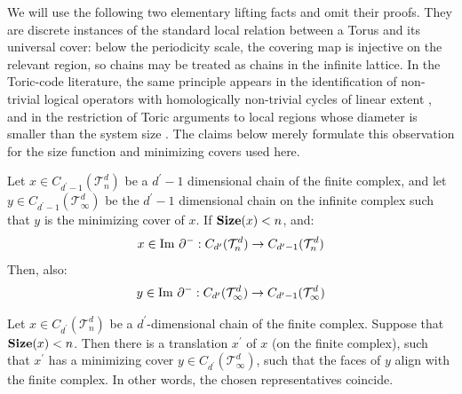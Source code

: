 We will use the following two elementary lifting facts and omit their proofs. They are discrete instances of the standard local relation between a Torus and its universal cover: below the periodicity scale, the covering map is injective on the relevant region, so chains may be treated as chains in the infinite lattice. In the Toric-code literature, the same principle appears in the identification of non-trivial logical operators with homologically non-trivial cycles of linear extent \cite{Dennis_2002}, and in the restriction of Toric arguments to local regions whose diameter is smaller than the system size \cite{Kubica_2019}. The claims below merely formulate this observation for the size function and minimizing covers used here.

\begin{claim}
  \label{claim:liftb}
  Let $x \in C_{d^{\prime}-1}(\mathcal{T}_n^d)$ be a $d^{\prime}-1$ dimensional chain of the finite complex, and let $y \in C_{d^{\prime}-1}(\mathcal T_\infty^d)$ be the $d^{\prime}-1$ dimensional chain on the infinite complex such that $y$ is the minimizing cover of $x$. If $\mathbf{Size}(x) < n$, and:
\begin{equation*}
  \begin{split}
    x \in \text{Im } \partial^{-} : C_{d^{\prime}}(\mathcal{T}_n^d) \rightarrow C_{d^{\prime}-1}(\mathcal{T}_n^d)
  \end{split}
\end{equation*}
Then, also:
\begin{equation*}
  \begin{split}
    y \in \text{Im } \partial^{-} : C_{d^{\prime}}(\mathcal T_\infty^d) \rightarrow C_{d^{\prime}-1}(\mathcal T_\infty^d)
  \end{split}
\end{equation*}
\end{claim}

\begin{claim}
  \label{claim:liftc}
Let $x \in C_{d^{\prime}}(\mathcal{T}_n^d)$ be a $d^{\prime}$-dimensional chain of the finite complex. Suppose that $\mathbf{Size}(x) < n$. Then there is a translation $x^{\prime}$ of $x$ (on the finite complex), such that $x^{\prime}$ has a minimizing cover $y \in C_{d^{\prime}}(\mathcal T_\infty^d)$, such that the faces of $y$ align with the finite complex. In other words, the chosen representatives coincide.
\end{claim}


